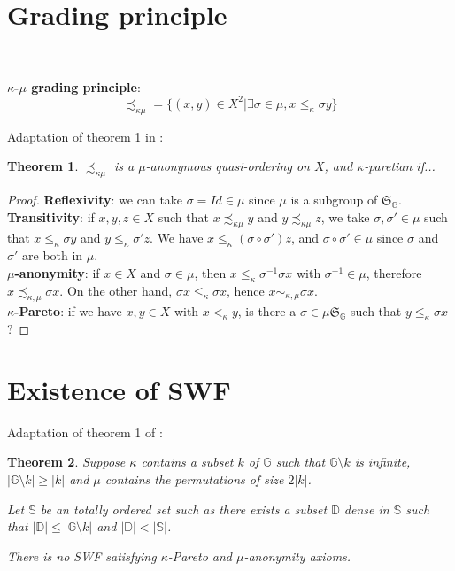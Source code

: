 \documentclass{article}
\newcommand{\G}{\mathbb{G}}
\newcommand{\D}{\mathbb{D}}
\newtheorem{theorem}{Theorem}
\begin{document}
\section{Grading principle}
\ \par
\textbf{$\kappa$-$\mu$ grading principle}:
\[\precsim_{\kappa\mu} = \{(x,y)\in X^2 |
\exists\sigma\in\mu, x \leq_\kappa \sigma y\}\]

Adaptation of theorem 1 in \cite{svensson80}:
\begin{theorem}
    $\precsim_{\kappa\mu}$ is a $\mu$-anonymous quasi-ordering on $X$, and
    $\kappa$-paretian if...
\end{theorem}
\begin{proof}
    \textbf{Reflexivity}: we can take $\sigma = Id\in\mu$ since $\mu$ is a
    subgroup of $\mathfrak{S}_\G$.\\
    \textbf{Transitivity}: if $x,y,z\in X$ such that $x \precsim_{\kappa\mu} y$ and 
    $y \precsim_{\kappa\mu} z$,
    we take $\sigma,\sigma'\in \mu$ such that $x\leq_\kappa \sigma y$ and
    $y\leq_\kappa \sigma' z$. We have $x\leq_\kappa (\sigma\circ\sigma')z$,
    and $\sigma\circ\sigma'\in\mu$ since $\sigma$ and $\sigma'$ are both in $\mu$.\\
    \textbf{$\mu$-anonymity}: if $x\in X$ and $\sigma\in\mu$, then
    $x\leq_\kappa\sigma^{-1}\sigma x$ with $\sigma^{-1}\in\mu$,
    therefore $x \precsim_{\kappa,\mu} \sigma x$. On the other hand,
    $\sigma x \leq_{\kappa}\sigma x$, hence $x \sim_{\kappa, \mu}\sigma x$.\\
    \textbf{$\kappa$-Pareto}: if we have $x,y\in X$ with $x<_\kappa y$, is there a
    $\sigma\in \mu\mathfrak{S}_\G$ such that $y\leq_\kappa \sigma x$? 
\end{proof}

\section{Existence of SWF}

Adaptation of theorem 1 of \cite{basumitra03}:
\begin{theorem}
  Suppose $\kappa$ contains a subset $k$ of $\G$ such that $\mathbb G\setminus k$ is infinite,
  $|\mathbb G\setminus k|\geq |k|$ and $\mu$ contains the permutations of size $2|k|$.

  Let $\mathbb S$ be an totally ordered set such as there exists a subset $\D$ dense in
  $\mathbb S$ such that $|\D|\leq |\G\setminus k|$ and $|\D|<|\mathbb S|$.

  There is no SWF satisfying $\kappa$-Pareto and $\mu$-anonymity axioms.
\end{theorem}
\end{document}

